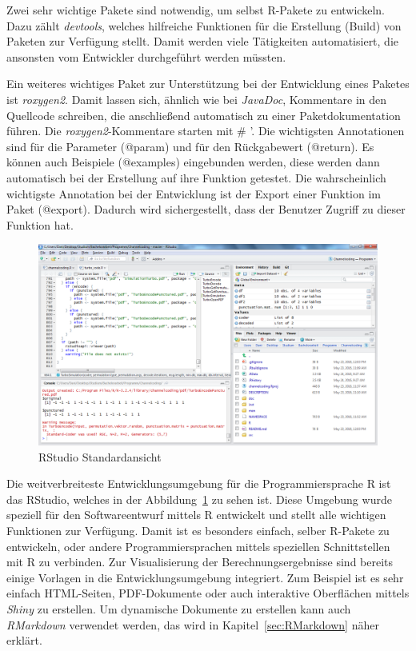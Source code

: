 Zwei sehr wichtige Pakete sind notwendig, um selbst R-Pakete zu entwickeln. Dazu zählt \emph{devtools}, welches hilfreiche Funktionen für die Erstellung (Build) von Paketen zur Verfügung stellt. Damit werden viele Tätigkeiten automatisiert, die ansonsten vom Entwickler durchgeführt werden müssten.~\cite{devtools}

Ein weiteres wichtiges Paket zur Unterstützung bei der Entwicklung eines Paketes ist \emph{roxygen2}. Damit lassen sich, ähnlich wie bei \emph{JavaDoc}, Kommentare in den Quellcode schreiben, die anschließend automatisch zu einer Paketdokumentation führen. Die \emph{roxygen2}-Kommentare starten mit \# '. Die wichtigsten Annotationen sind für die Parameter (@param) und für den Rückgabewert (@return). Es können auch Beispiele (@examples) eingebunden werden, diese werden dann automatisch bei der Erstellung auf ihre Funktion getestet. Die wahrscheinlich wichtigste Annotation bei der Entwicklung ist der Export einer Funktion im Paket (@export). Dadurch wird sichergestellt, dass der Benutzer Zugriff zu dieser Funktion hat.~\cite{roxygen}

\begin{figure}[th]
\centering
\includegraphics[width=\ScaleIfNeeded]{pictures/RStudio}
\caption{RStudio Standardansicht}
\label{pic:RStudio}
\end{figure}

Die weitverbreiteste Entwicklungsumgebung für die Programmiersprache R ist das RStudio, welches in der Abbildung~\ref{pic:RStudio} zu sehen ist. Diese Umgebung wurde speziell für den Softwareentwurf mittels R entwickelt und stellt alle wichtigen Funktionen zur Verfügung. Damit ist es besonders einfach, selber R-Pakete zu entwickeln, oder andere Programmiersprachen mittels speziellen Schnittstellen mit R zu verbinden. Zur Visualisierung der Berechnungsergebnisse sind bereits einige Vorlagen in die Entwicklungsumgebung integriert. Zum Beispiel ist es sehr einfach HTML-Seiten, PDF-Dokumente oder auch interaktive Oberflächen mittels \emph{Shiny} zu erstellen. Um dynamische Dokumente zu erstellen kann auch \emph{RMarkdown} verwendet werden, das wird in Kapitel~\ref{sec:RMarkdown} näher erklärt.

